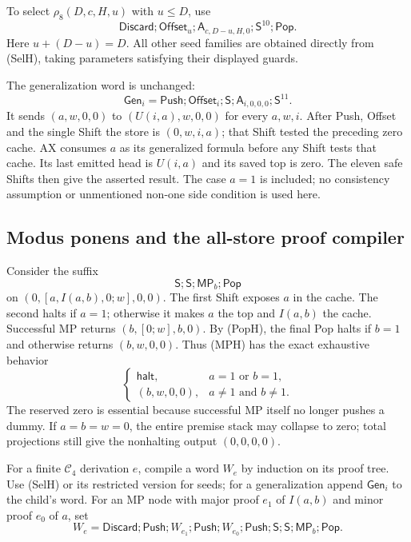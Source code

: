 To select $\rho_8(D,c,H,u)$ with $u\leq D$, use
\[
 \mathsf{Discard};\mathsf{Offset}_u;
 \mathsf A_{c,D-u,H,0};\mathsf S^{10};\mathsf{Pop}.
\]
Here $u+(D-u)=D$.  All other seed families are obtained directly from
(SelH), taking parameters satisfying their displayed guards.

The generalization word is unchanged:
\[
 \mathsf{Gen}_i=\mathsf{Push};\mathsf{Offset}_i;\mathsf S;
                  \mathsf A_{i,0,0,0};\mathsf S^{11}.
\]
It sends $(a,w,0,0)$ to $(U(i,a),w,0,0)$ for every $a,w,i$.
After Push, Offset and the single Shift the store is $(0,w,i,a)$;
that Shift tested the preceding zero cache.  AX consumes $a$ as its
generalized formula before any Shift tests that cache.  Its last emitted
head is $U(i,a)$ and its saved top is zero.  The eleven safe Shifts then
give the asserted result.  The case $a=1$ is included; no consistency
assumption or unmentioned non-one side condition is used here.

\subsection{Modus ponens and the all-store proof compiler}

Consider the suffix
\[
       \mathsf S;\mathsf S;\mathsf{MP}_b;\mathsf{Pop}            \tag{MPH}
\]
on $(0,[a,I(a,b),0;w],0,0)$.  The first Shift exposes $a$ in the
cache.  The second halts if $a=1$; otherwise it makes $a$ the top and
$I(a,b)$ the cache.  Successful MP returns
$(b,[0;w],b,0)$.  By (PopH), the final Pop halts if $b=1$ and otherwise
returns $(b,w,0,0)$.  Thus (MPH) has the exact exhaustive behavior
\[
 \begin{cases}
 \mathsf{halt},&a=1\text{ or }b=1,\\
 (b,w,0,0),&a\ne1\text{ and }b\ne1.
 \end{cases}
\]
The reserved zero is essential because successful MP itself no longer
pushes a dummy.  If $a=b=w=0$, the entire premise stack may collapse to
zero; total projections still give the nonhalting output $(0,0,0,0)$.

For a finite $\mathcal C_4$ derivation $e$, compile a word $W_e$ by
induction on its proof tree.  Use (SelH) or its restricted version for
seeds; for a generalization append $\mathsf{Gen}_i$ to the child's word.
For an MP node with major proof $e_1$ of $I(a,b)$ and minor proof $e_0$
of $a$, set
\[
 W_e=\mathsf{Discard};\mathsf{Push};W_{e_1};\mathsf{Push};
       W_{e_0};\mathsf{Push};\mathsf S;\mathsf S;
                           \mathsf{MP}_b;\mathsf{Pop}.
\]

